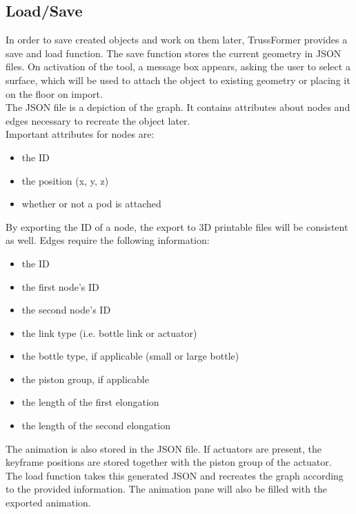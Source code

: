 \subsection{Load/Save}
In order to save created objects and work on them later, TrussFormer provides a save and load function. The save function stores the current geometry in JSON files. On activation of the tool, a message box appears, asking the user to select a surface, which will be used to attach the object to existing geometry or placing it on the floor on import.\\
The JSON file is a depiction of the graph. It contains attributes about nodes and edges necessary to recreate the object later.\\
Important attributes for nodes are:
\begin{itemize}
  \item the ID
  \item the position (x, y, z)
  \item whether or not a pod is attached
\end{itemize}
By exporting the ID of a node, the export to 3D printable files will be consistent as well.
Edges require the following information:
\begin{itemize}
  \item the ID
  \item the first node's ID
  \item the second node's ID
  \item the link type (i.e. bottle link or actuator)
  \item the bottle type, if applicable (small or large bottle)
  \item the piston group, if applicable
  \item the length of the first elongation
  \item the length of the second elongation
\end{itemize}
The animation is also stored in the JSON file. If actuators are present, the keyframe positions are stored together with the piston group of the actuator.\\
The load function takes this generated JSON and recreates the graph according to the provided information. The animation pane will also be filled with the exported animation.

